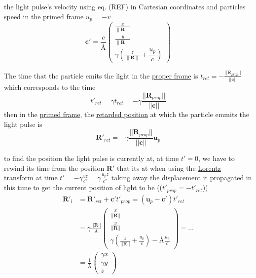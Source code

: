 the light pulse's velocity using eq. (REF) in Cartesian coordinates and particles speed in the \hyperlink{def-Primed-Frame}{primed frame} $u_p=-v$
\begin{equation}%
\label{light pulse velocity transform}
    \mathbf{c'} =  \dfrac{c}{\text{\AA}} \begin{pmatrix}
    \frac{x}{\|\mathbf{R}\|}\\ \frac{y}{\|\mathbf{R}\|} \\ \gamma \left( \frac{z}{\|\mathbf{R}\|} + \dfrac{u_p}{c} \right)
    \end{pmatrix}
\end{equation}%

The time that the particle emits the light in the \hyperlink{def-proper-frame}{proper frame} is $t_{ret}= - \frac{||\mathbf{R}_{prop}||}{||\mathbf{c}||}$ which corresponds to the time
\begin{equation}%
    t'_{ret}= \gamma t_{ret} = - \gamma \frac{||\mathbf{R}_{prop}||}{||\mathbf{c}||}
\end{equation}%
then in the \hyperlink{def-Primed-Frame}{primed frame}, the \hyperlink{def-retarded-position}{retarded position}  at which the particle emmits the light pulse is
\begin{equation}%
    \mathbf{R'}_{ret} = - \gamma \frac{||\mathbf{R}_{prop}||}{||\mathbf{c}||} \mathbf{u}_p
\end{equation}%

to find the position the light pulse is currently at, at time $t'=0$, we have to rewind its time from the position $\mathbf{R}'$ that its at when using the \hyperlink{def-lorentz-transform}{Lorentz transform} at time $t'= -\gamma\frac{vz}{c^2}= \gamma\frac{u_p z}{c^2}$ taking away the displacement it propagated in this time to get the current position of light to be (($t'_{prop} = - t'_{ret}$))
\begin{equation}%
\begin{split}
    \mathbf{R'}_l &= \mathbf{R'}_{ret} + \mathbf{c'}t'_{prop} = \left( \mathbf{u}_p - \mathbf{c}' \right)t'_{ret} \\
    &= \gamma \frac{||\mathbf{R}||}{\text{\AA}} 
    \begin{pmatrix}
    \frac{x}{||\mathbf{R}||}\\  \frac{y}{||\mathbf{R}||} \\ \gamma \left( \frac{z}{||\mathbf{R}||} +\frac{u_p}{c}\right) - \text{\AA}\frac{u_p}{c}
    \end{pmatrix} 
    = ...\\
    &= \frac{1}{\text{\AA}} 
    \begin{pmatrix}
    \gamma x\\  \gamma y \\ z
    \end{pmatrix}     
\end{split}
\end{equation}%

